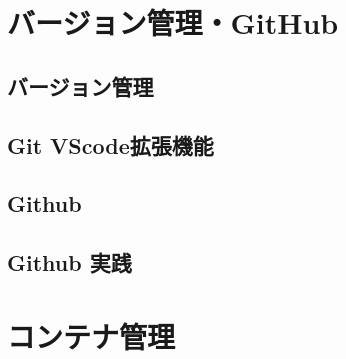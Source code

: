 \documentclass[12pt]{jsarticle}
\begin{document}
\newpage
\section{バージョン管理・GitHub}
\subsection{バージョン管理}


\subsection{Git VScode拡張機能}


\subsection{Github}


\subsection{Github 実践}


\newpage
\section{コンテナ管理}
\end{document}
